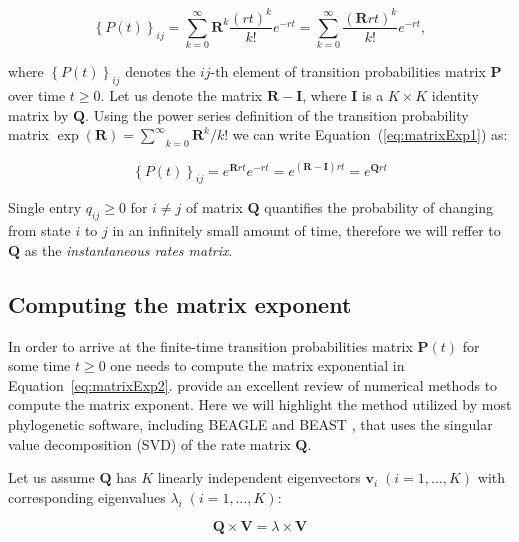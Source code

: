 \begin{equation}
\left\{ P(t)\right\} _{ij}=\underset{k=0}{\overset{\infty}{\sum}}\mathbf{R}^{k}\frac{(r t)^{k}}{k!}e^{-r t}=\underset{k=0}{\overset{\infty}{\sum}}\frac{(\mathbf{R}r t)^{k}}{k!}e^{-r t},
\label{eq:matrixExp1}
\end{equation}

\noindent
where $\left\{ P(t)\right\} _{ij}$ denotes the $ij\text{-th}$ element of transition probabilities matrix $\mathbf{P}$ over time $t \geq 0$.
Let us denote the matrix $\mathbf{R}-\mathbf{I}$, where $\mathbf{I}$ is a $K \times K$ identity matrix by $\mathbf{Q}$.
Using the power series definition of the transition probability matrix $\exp(\mathbf{R})=\underset{k=0}{\overset{\infty}{\sum}}\mathbf{R}^{k}/k!$ we can write Equation~(\ref{eq:matrixExp1}) as:

\begin{equation}
\left\{ P(t)\right\} _{ij}=e^{\mathbf{R}r t}e^{-r t} =e^{(\mathbf{R}-\mathbf{I})r t}=e^{\mathbf{Q}r t} 
\label{eq:matrixExp2}
\end{equation}

\noindent
Single entry $q_{ij} \ge 0$ for $i \neq j$ of matrix $\mathbf{Q}$ quantifies the probability of changing from state $i$ to $j$ in an infinitely small amount of time, therefore we will reffer to $\mathbf{Q}$ as the \emph{instantaneous rates matrix}.

\subsection{Computing the matrix exponent \label{sub:exponentiation}}

In order to arrive at the finite-time transition probabilities matrix $\mathbf{P}(t)$ for some time $t\geq0$ one needs to compute the matrix exponential in Equation~\ref{eq:matrixExp2}.
\cite{Moler1978} provide an excellent review of numerical methods to compute the matrix exponent. 
Here we will highlight the method utilized by most phylogenetic software, including BEAGLE \citep{Ayres2012} and BEAST \citep{Drummond2012}, that uses the singular value decomposition (SVD) of the rate matrix $\mathbf{Q}$.   

Let us assume $\mathbf{Q}$ has $K$ linearly independent eigenvectors $\mathbf{v}_{i} \; (i=1,\ldots,K)$ with corresponding eigenvalues $\lambda_{i}\;(i=1,\ldots,K)$:

\begin{equation}
\mathbf{Q}\times\mathbf{V}=\lambda\times\mathbf{V}
\label{eq:eigenvaluesEigenvectors}
\end{equation}

